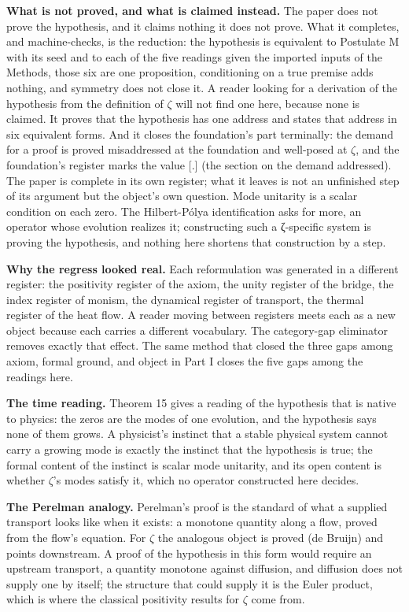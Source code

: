 \documentclass[10pt,twocolumn]{article}
\begin{document}
\textbf{What is not proved, and what is claimed instead.} The paper does
not prove the hypothesis, and it claims nothing it does not prove. What
it completes, and machine-checks, is the reduction: the hypothesis is
equivalent to Postulate M with its seed and to each of the five readings
given the imported inputs of the Methods, those six are one proposition,
conditioning on a true premise adds nothing, and symmetry does not close
it. A reader looking for a derivation of the hypothesis from the
definition of \(\zeta\) will not find one here, because none is claimed.
It proves that the hypothesis has one address and states that address in
six equivalent forms. And it closes the foundation's part terminally:
the demand for a proof is proved misaddressed at the foundation and
well-posed at \(\zeta\), and the foundation's register marks the value
{[}.{]} (the section on the demand addressed). The paper is complete in
its own register; what it leaves is not an unfinished step of its
argument but the object's own question. Mode unitarity is a scalar
condition on each zero. The Hilbert-Pólya identification asks for more,
an operator whose evolution realizes it; constructing such a ζ-specific
system is proving the hypothesis, and nothing here shortens that
construction by a step.

\textbf{Why the regress looked real.} Each reformulation was generated
in a different register: the positivity register of the axiom, the unity
register of the bridge, the index register of monism, the dynamical
register of transport, the thermal register of the heat flow. A reader
moving between registers meets each as a new object because each carries
a different vocabulary. The category-gap eliminator removes exactly that
effect. The same method that closed the three gaps among axiom, formal
ground, and object in Part I closes the five gaps among the readings
here.

\textbf{The time reading.} Theorem 15 gives a reading of the hypothesis
that is native to physics: the zeros are the modes of one evolution, and
the hypothesis says none of them grows. A physicist's instinct that a
stable physical system cannot carry a growing mode is exactly the
instinct that the hypothesis is true; the formal content of the instinct
is scalar mode unitarity, and its open content is whether \(\zeta\)'s
modes satisfy it, which no operator constructed here decides.

\textbf{The Perelman analogy.} Perelman's proof is the standard of what
a supplied transport looks like when it exists: a monotone quantity
along a flow, proved from the flow's equation. For \(\zeta\) the
analogous object is proved (de Bruijn) and points downstream. A proof of
the hypothesis in this form would require an upstream transport, a
quantity monotone against diffusion, and diffusion does not supply one
by itself; the structure that could supply it is the Euler product,
which is where the classical positivity results for \(\zeta\) come from.
\end{document}
